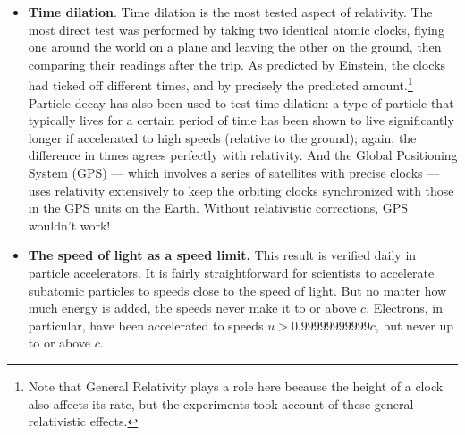 \begin{itemize}
\item {\bf Time dilation}.  Time dilation is the most tested aspect of
relativity.  The most direct test was performed by taking two
identical atomic clocks, flying one around the world on a plane and
leaving the other on the ground, then comparing their readings after
the trip.  As predicted by Einstein, the clocks had ticked off
different times, and by precisely the predicted amount.\footnote{Note
that General Relativity plays a role here because the height of a
clock also affects its rate, but the experiments took account of these
general relativistic effects.} Particle decay has also been used to
test time dilation: a type of particle that typically lives for a
certain period of time has been shown to live significantly longer if
accelerated to high speeds (relative to the ground); again, the
difference in times agrees perfectly with relativity.  And the Global
Positioning System (GPS) --- which involves a series of satellites
with precise clocks --- uses relativity extensively to keep the
orbiting clocks synchronized with those in the GPS units on the Earth.
Without relativistic corrections, GPS wouldn't work!
   
\item {\bf The speed of light as a speed limit.}  This result is verified
daily in particle accelerators.  It is fairly straightforward for
scientists to accelerate subatomic particles to speeds close to the
speed of light.  But no matter how much energy is added, the speeds
never make it to or above $c$.  Electrons, in particular, have been
accelerated to speeds $u> 0.99999999999c$, but never up to or above $c$.
   

\end{itemize}
